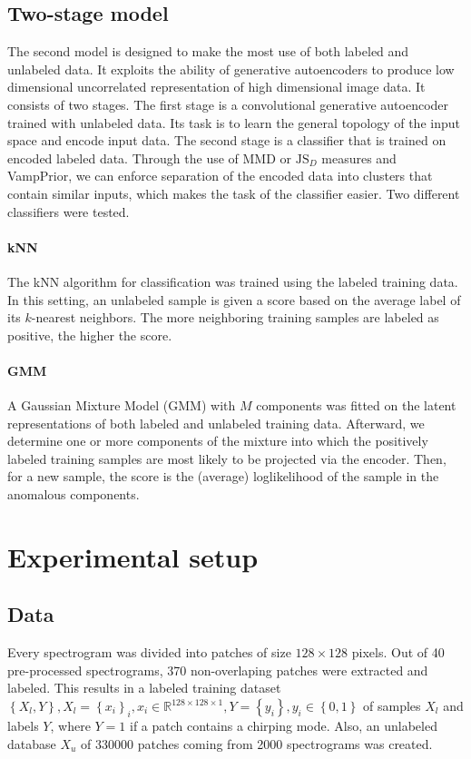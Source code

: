 \subsection{Two-stage model}
The second model is designed to make the most use of both labeled and unlabeled data. It exploits the ability of generative autoencoders to produce low dimensional uncorrelated representation of high dimensional image data. It consists of two stages. The first stage is a convolutional generative autoencoder trained with unlabeled data. Its task is to learn the general topology of the input space and encode input data. The second stage is a classifier that is trained on encoded labeled data. Through the use of MMD or $\text{JS}_D$ measures and VampPrior, we can enforce separation of the encoded data into clusters that contain similar inputs, which makes the task of the classifier easier. Two different classifiers were tested.


\paragraph{kNN} The kNN algorithm for classification\cite{deng2016efficient} was trained using the labeled training data. In this setting, an unlabeled sample is given a score based on the average label of its $k$-nearest neighbors. The more neighboring training samples are labeled as positive, the higher the score.

\paragraph{GMM} A Gaussian Mixture Model (GMM)\cite{huang2005gaussian} with $M$ components was fitted on the latent representations of both labeled and unlabeled training data. Afterward, we determine one or more components of the mixture into which the positively labeled training samples are most likely to be projected via the encoder. Then, for a new sample, the score is the (average) loglikelihood of the sample in the anomalous components. 

\section{Experimental setup}

\subsection{Data}
Every spectrogram was divided into patches of size $128\times128$ pixels. Out of 40 pre-processed spectrograms, 370 non-overlaping patches were extracted and labeled. This results in a labeled training dataset $\left\{ X_{l},Y\right\} ,X_{l}=\left\{ x_{i}\right\} _{i},x_{i} \in \mathbb{R}^{128\times128\times1}, Y=\left\{ y_{i}\right\} ,y_{i}\in\left\{ 0,1\right\}$ of samples $X_{l}$ and labels $Y$, where $Y=1$ if a patch contains a chirping mode. Also, an unlabeled database $X_{u}$ of 330000 patches coming from 2000 spectrograms was created. 

